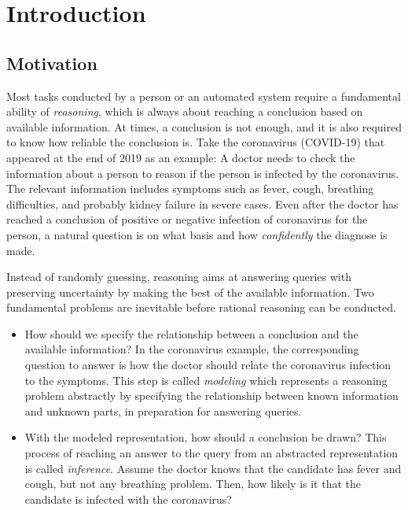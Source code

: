 \chapter{Introduction}
\label{chapter1}

\section{Motivation}
\label{section1.1}

Most tasks conducted by a person or an automated system require a fundamental ability of \textit{reasoning}, which is always about reaching a conclusion based on available information. At times, a conclusion is not enough, and it is also required to know how reliable the conclusion is. Take the coronavirus (COVID-19) that appeared at the end of 2019 as an example: A doctor needs to check the information about a person to reason if the person is infected by the coronavirus. The relevant information includes symptoms such as fever, cough, breathing difficulties, and probably kidney failure in severe cases. Even after the doctor has reached a conclusion of positive or negative infection of coronavirus for the person, a natural question is on what basis and how \textit{confidently} the diagnose is made.

Instead of randomly guessing, reasoning aims at answering queries with preserving uncertainty by making the best of the available information. Two fundamental problems are inevitable before rational reasoning can be conducted. 
\begin{itemize}
\item How should we specify the relationship between a conclusion and the available information? In the coronavirus example, the corresponding question to answer is how the doctor should relate the coronavirus infection to the symptoms. This step is called \textit{modeling} which represents a reasoning problem abstractly by specifying the relationship between known information and unknown parts, in preparation for answering queries.
\item With the modeled representation, how should a conclusion be drawn? This process of reaching an answer to the query from an abstracted representation is called \textit{inference}. Assume the doctor knows that the candidate has fever and cough, but not any breathing problem. Then, how likely is it that the candidate is infected with the coronavirus?
\end{itemize}

